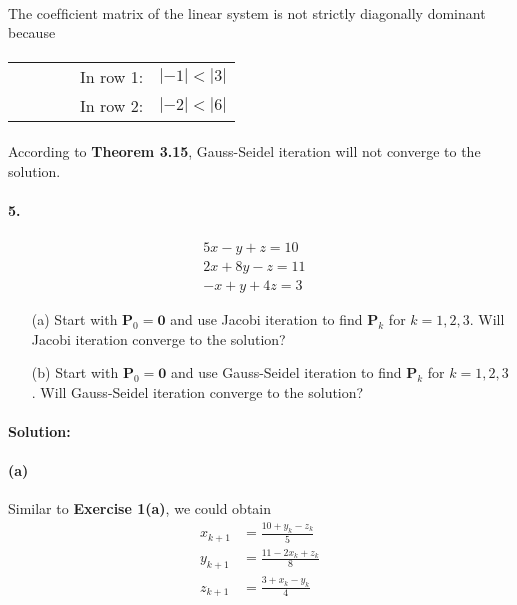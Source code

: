 \documentclass{article}  %
\begin{document}
        \paragraph{}The coefﬁcient matrix of the linear system is not strictly diagonally dominant because
        \paragraph{}
        \renewcommand\tabcolsep{12.0pt} %
        \begin{threeparttable} %
            \begin{tabular}{cccccc} 
             & & & & In row 1: & $|-1| < |3|$ \\
             & & & & In row 2: & $|-2| < |6|$
            \end{tabular} 
        \end{threeparttable}
        \paragraph{}According to \textbf{Theorem 3.15}, Gauss-Seidel iteration will not converge to the solution.
        \paragraph{5.}
        \begin{align*}
            5x - y + z = 10 &\\
            2x + 8y - z = 11 &\\
            -x + y + 4z = 3 &
        \end{align*}
        \begin{enumerate}
            \item[(a)] 
            Start with $\bm{P}_0 = \bm{0}$ and use Jacobi iteration to find $\bm{P}_k$ for $k = 1, 2, 3$. Will Jacobi iteration converge to the solution?
            \item[(b)]
            Start with $\bm{P}_0 = \bm{0}$ and use Gauss-Seidel iteration to find $\bm{P}_k$ for $k = 1, 2, 3$. Will Gauss-Seidel iteration converge to the solution?
        \end{enumerate}
        \paragraph{Solution:}
        \paragraph{(a)}Similar to \textbf{Exercise 1(a)}, we could obtain 
        \begin{align*}
            x_{k+1} &= \frac{10 + y_k - z_k}{5} \\
            y_{k+1} &= \frac{11 -2x_k + z_k}{8} \\
            z_{k+1} &= \frac{3 + x_k - y_k}{4}
        \end{align*}
\end{document}
